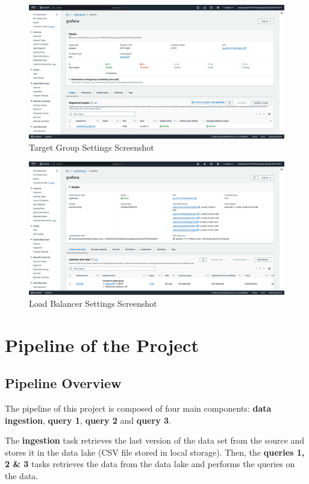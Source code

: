 \documentclass[12pt,oneside]{book} %
\begin{document}
\begin{figure}[H]
    \centering
    \includegraphics[width=1\linewidth]{images/target-group.png}
    \caption{Target Group Settings Screenshot}
\end{figure}

\begin{figure}[H]
    \centering
    \includegraphics[width=1\linewidth]{images/load-balancer.png}
    \caption{Load Balancer Settings Screenshot}
\end{figure}

\newpage
\section{Pipeline of the Project}
\subsection{Pipeline Overview}

The pipeline of this project is composed of four main components: \textbf{data
    ingestion}, \textbf{query 1}, \textbf{query 2} and \textbf{query 3}.\newline

The \textbf{ingestion} task retrieves the last version of the data set from the
source and stores it in the data lake (CSV file stored in local storage). Then,
the \textbf{queries 1, 2 \& 3} tasks retrieves the data from the data lake and
performs the queries on the data.
\end{document}
